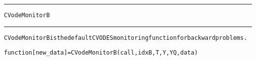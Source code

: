\begin{samepage}
\hrule
\begin{center}
{\large \verb!CVodeMonitorB!}
\label{p:CVodeMonitorB}
\end{center}
\hrule\vspace{0.1in}



\begin{alltt}
CVodeMonitorB is the default CVODES monitoring function for backward problems.
\end{alltt}

\end{samepage}



\begin{samepage}


\begin{alltt}
function [new_data] = CVodeMonitorB(call, idxB, T, Y, YQ, data) 
\end{alltt}

\end{samepage}



